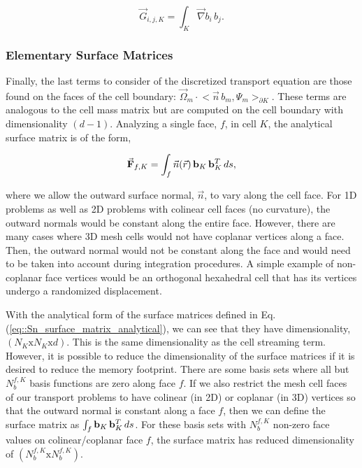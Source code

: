 \begin{equation}
\label{eq::Sn_streaming_matrix_entry}
\vec{G}_{i,j,K} =  \int_K \vec{\nabla}b_i \, b_j .
\end{equation}

\subsubsection{Elementary Surface Matrices}
\label{sec::Sn_Spatial_Matrices_Surface}

Finally, the last terms to consider of the discretized transport equation are those found on the faces of the cell boundary: $  \vec{\Omega}_m \cdot  \Big<  \vec{n} \, b_m, \Psi_m  \Big>_{\partial K}$. These terms are analogous to the cell mass matrix but are computed on the cell boundary with dimensionality $(d-1)$. Analyzing a single face, $f$, in cell $K$, the analytical surface matrix is of the form,

\begin{equation}
\label{eq::Sn_surface_matrix_analytical}
\vec{{\bf F}}_{f,K}  =    \int_f \vec{n} (\vec{r}) \, {\bf b}_K \, {\bf b}_K^T \, d s ,
\end{equation}

\noindent where we allow the outward surface normal, $\vec{n}$, to vary along the cell face. For 1D problems as well as 2D problems with colinear cell faces (no curvature), the outward normals would be constant along the entire face. However, there are many cases where 3D mesh cells would not have coplanar vertices along a face. Then, the outward normal would not be constant along the face and would need to be taken into account during integration procedures. A simple example of non-coplanar face vertices would be an orthogonal hexahedral cell that has its vertices undergo a randomized displacement.

With the analytical form of the surface matrices defined in Eq. (\ref{eq::Sn_surface_matrix_analytical}), we can see that they have dimensionality, $(N_K \text{x} N_K \text{x} d)$. This is the same dimensionality as the cell streaming term. However, it is possible to reduce the dimensionality of the surface matrices if it is desired to reduce the memory footprint. There are some basis sets where all but $N_b^{f,K}$ basis functions are zero along face $f$. If we also restrict the mesh cell faces of our transport problems to have colinear (in 2D) or coplanar (in 3D) vertices so that the outward normal is constant along a face $f$, then we can define the surface matrix as $\int_f {\bf b}_K \, {\bf b}_K^T \, d s$. For these basis sets with $N_b^{f,K}$ non-zero face values on colinear/coplanar face $f$, the surface matrix has reduced dimensionality of $(N_b^{f,K} \text{x} N_b^{f,K})$.

